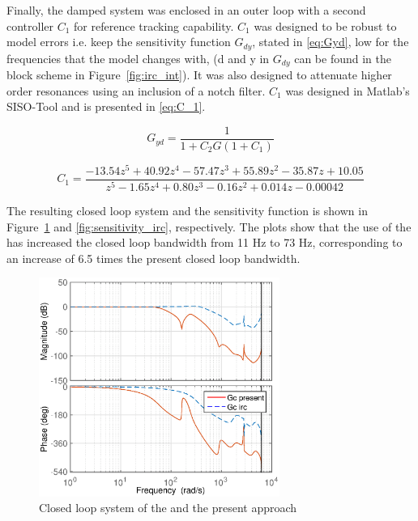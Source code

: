 Finally, the damped system was enclosed in an outer loop with a second controller $C_1$ for reference tracking capability. $C_1$ was designed to be robust to model errors i.e. keep the sensitivity function $G_{dy}$, stated in \eqref{eq:Gyd}, low for the frequencies that the model changes with, (d and y in $G_{dy}$ can be found in the block scheme in Figure~\ref{fig:irc_int}). It was also designed to attenuate higher order resonances using an inclusion of a notch filter.  $C_1$ was designed in Matlab's SISO-Tool and is presented in \eqref{eq:C_1}.

\begin{equation}
  \label{eq:Gyd}
  G_{yd} = \frac{1}{1 + C_2G(1 + C_1)}
\end{equation}

\begin{equation}
  \label{eq:C_1}
  C_1 = \frac{-13.54 z^5 + 40.92 z^4 - 57.47 z^3 + 55.89 z^2 - 35.87 z + 10.05}{z^5 - 1.65 z^4 + 0.80 z^3 - 0.16 z^2 + 0.014 z - 0.00042}
\end{equation}

The resulting closed loop system and the sensitivity function is shown in Figure~\ref{fig:irc_totalclosed} and \ref{fig:sensitivity_irc}, respectively. The plots show that the use of the \abbrIRC has increased the closed loop bandwidth from 11 Hz to 73 Hz, corresponding to an increase of 6.5 times the present closed loop bandwidth.

\begin{figure}[h!]
  \centering
  \includegraphics[width=0.7\textwidth]{fig/matlab/totalclosedloop.eps}
  \caption{\label{fig:irc_totalclosed} Closed loop system of the \abbrIRC and the present approach}
\end{figure}

